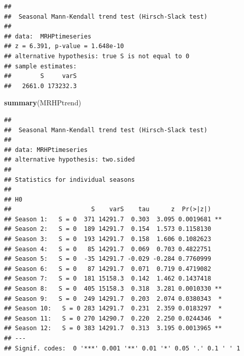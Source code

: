 \documentclass[12pt,]{article}
\newenvironment{Shaded}{\begin{snugshade}}{\end{snugshade}}
\newcommand{\CommentTok}[1]{\textcolor[rgb]{0.56,0.35,0.01}{\textit{#1}}}
\newcommand{\DataTypeTok}[1]{\textcolor[rgb]{0.13,0.29,0.53}{#1}}
\newcommand{\DecValTok}[1]{\textcolor[rgb]{0.00,0.00,0.81}{#1}}
\newcommand{\KeywordTok}[1]{\textcolor[rgb]{0.13,0.29,0.53}{\textbf{#1}}}
\newcommand{\NormalTok}[1]{#1}
\newcommand{\OperatorTok}[1]{\textcolor[rgb]{0.81,0.36,0.00}{\textbf{#1}}}
\newcommand{\StringTok}[1]{\textcolor[rgb]{0.31,0.60,0.02}{#1}}
\begin{document}
\begin{Shaded}
\end{Shaded}

\begin{verbatim}
## 
##  Seasonal Mann-Kendall trend test (Hirsch-Slack test)
## 
## data:  MRHPtimeseries
## z = 6.391, p-value = 1.648e-10
## alternative hypothesis: true S is not equal to 0
## sample estimates:
##        S     varS 
##   2661.0 173232.3
\end{verbatim}

\begin{Shaded}
\begin{Highlighting}[]
\KeywordTok{summary}\NormalTok{(MRHPtrend)}
\end{Highlighting}
\end{Shaded}

\begin{verbatim}
## 
##  Seasonal Mann-Kendall trend test (Hirsch-Slack test)
## 
## data: MRHPtimeseries
## alternative hypothesis: two.sided
## 
## Statistics for individual seasons
## 
## H0
##                      S    varS    tau      z  Pr(>|z|)   
## Season 1:   S = 0  371 14291.7  0.303  3.095 0.0019681 **
## Season 2:   S = 0  189 14291.7  0.154  1.573 0.1158130   
## Season 3:   S = 0  193 14291.7  0.158  1.606 0.1082623   
## Season 4:   S = 0   85 14291.7  0.069  0.703 0.4822751   
## Season 5:   S = 0  -35 14291.7 -0.029 -0.284 0.7760999   
## Season 6:   S = 0   87 14291.7  0.071  0.719 0.4719082   
## Season 7:   S = 0  181 15158.3  0.142  1.462 0.1437418   
## Season 8:   S = 0  405 15158.3  0.318  3.281 0.0010330 **
## Season 9:   S = 0  249 14291.7  0.203  2.074 0.0380343  *
## Season 10:   S = 0 283 14291.7  0.231  2.359 0.0183297  *
## Season 11:   S = 0 270 14290.7  0.220  2.250 0.0244346  *
## Season 12:   S = 0 383 14291.7  0.313  3.195 0.0013965 **
## ---
## Signif. codes:  0 '***' 0.001 '**' 0.01 '*' 0.05 '.' 0.1 ' ' 1
\end{verbatim}
\end{document}

